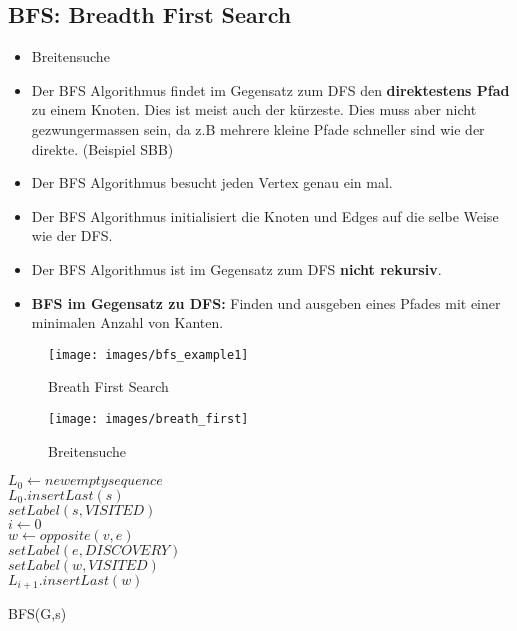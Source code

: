 \clearpage

\subsection{BFS: Breadth First Search}
\begin{itemize}
	\item Breitensuche
	\item Der BFS Algorithmus findet im Gegensatz zum DFS den \textbf{direktestens Pfad} zu einem Knoten. Dies ist meist auch der kürzeste. Dies muss aber nicht gezwungermassen sein, da z.B mehrere kleine Pfade schneller sind wie der direkte. (Beispiel SBB)
	\item Der BFS Algorithmus besucht jeden Vertex genau ein mal.
	\item Der BFS Algorithmus initialisiert die Knoten und Edges auf die selbe Weise wie der DFS. 
	\item Der BFS Algorithmus ist im Gegensatz zum DFS \textbf{nicht rekursiv}.
	\item \textbf{BFS im Gegensatz zu DFS:} Finden und ausgeben eines Pfades mit einer minimalen Anzahl von Kanten.
\end{itemize}
\begin{figure}[h]
\centering
\texttt{[image: images/bfs\_example1]}
\caption{Breath First Search}
\label{fig:bfsexample1}
\end{figure}

\begin{figure}[h!]
	\centering
	\texttt{[image: images/breath\_first]}
	\caption{Breitensuche}
	\label{fig:breathfirst}
\end{figure}


\begin{algorithm}[H]
	$L_0 \leftarrow new empty sequence$ \\
	$L_0.insertLast(s)$ \\
	$setLabel(s, VISITED)$ \\
	$i \leftarrow 0$ \\
	 {
		{
			{
				 {
					$w \leftarrow opposite(v,e)$ \\
					 {
						$setLabel(e, DISCOVERY)$ \\
						$setLabel(w, VISITED)$ \\
						$L_{i+1}.insertLast(w)$ \\
					}
				}
			}
		}
	}

	\caption{BFS(G,s)}
\end{algorithm}
\clearpage


